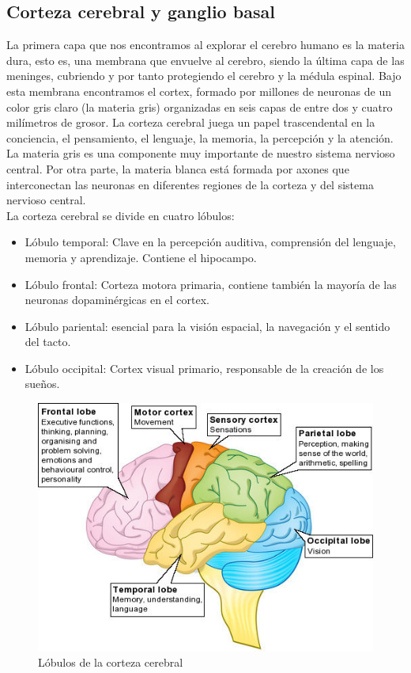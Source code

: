 \subsection{Corteza cerebral y ganglio basal}

La primera capa que nos encontramos al explorar el cerebro humano es la materia dura, esto es, una membrana que envuelve al cerebro, siendo la última capa de las meninges, cubriendo y por tanto protegiendo el cerebro y la médula espinal. Bajo esta membrana encontramos el cortex, formado por millones de neuronas de un color gris claro (la materia gris) organizadas en seis capas de entre dos y cuatro milímetros de grosor. La corteza cerebral juega un papel trascendental en la conciencia, el pensamiento, el lenguaje, la memoria, la percepción y la atención. La materia gris es una componente muy importante de nuestro sistema nervioso central. Por otra parte, la materia blanca está formada por axones que interconectan las neuronas en diferentes regiones de la corteza y del sistema nervioso central. \\

La corteza cerebral se divide en cuatro lóbulos: \\

\begin{itemize}
	\item Lóbulo temporal: Clave en la percepción auditiva, comprensión del lenguaje, memoria y aprendizaje. Contiene el hipocampo.
	\item Lóbulo frontal: Corteza motora primaria, contiene también la mayoría de las neuronas dopaminérgicas en el cortex.
	\item Lóbulo pariental: esencial para la visión espacial, la navegación y el sentido del tacto.
	\item Lóbulo occipital: Cortex visual primario, responsable de la creación de los sueños.
\end{itemize}

\begin{figure}[H] %
	\centering
	\includegraphics[scale=0.6]{bl.jpg}  %
	\caption{Lóbulos de la corteza cerebral} 
	\label{fig:bl}
\end{figure}

